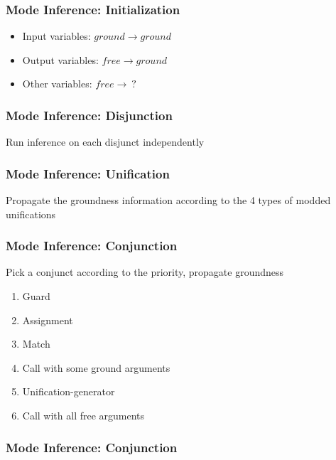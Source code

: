 \documentclass[xcolor=table]{beamer}
\begin{document}
\begin{frame}[fragile]
  \frametitle{Mode Inference: Initialization }

\begin{itemize}
  \item Input variables: $ground \rightarrow ground $
  \item Output variables: $free \rightarrow ground$
  \item Other variables: $free \rightarrow \ ?$
\end{itemize}

\vfill


\end{frame}

\begin{frame}[fragile]
  \frametitle{Mode Inference: Disjunction }
Run inference on each disjunct independently

\vfill



\end{frame}


\begin{frame}[fragile]
  \frametitle{Mode Inference: Unification}
Propagate the groundness information according to the 4 types of modded unifications

\vfill



\end{frame}

\begin{frame}[fragile]
  \frametitle{Mode Inference: Conjunction}
Pick a conjunct according to the priority, propagate groundness

\vfill

\begin{enumerate}
  \item Guard
  \item Assignment
  \item Match
  \item Call with some ground arguments
  \item Unification-generator
  \item Call with all free arguments
\end{enumerate}
\end{frame}

\begin{frame}[fragile]
  \frametitle{Mode Inference: Conjunction}
 \pause
 \pause

\end{frame}
\end{document}
